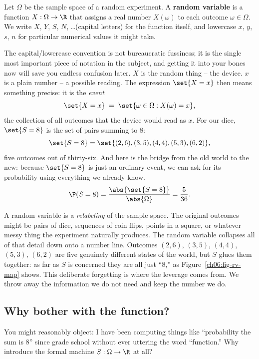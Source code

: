 \begin{definition}
\label{ch06:def-rv}
Let $\Omega$ be the sample space of a random experiment. A \textbf{random variable} is
a function $X : \Omega \to \R$ that assigns a real number $X(\omega)$ to each outcome
$\omega \in \Omega$. We write $X$, $Y$, $S$, $N$, \dots (capital letters) for the
function itself, and lowercase $x$, $y$, $s$, $n$ for particular numerical values it
might take.
\end{definition}

The capital/lowercase convention is not bureaucratic fussiness; it is the single most
important piece of notation in the subject, and getting it into your bones now will
save you endless confusion later. $X$ is the random thing -- the device. $x$ is a
plain number -- a possible reading. The expression $\set{X = x}$ then means something
precise: it is the \emph{event}
\[
  \set{X = x} \;=\; \set{\omega \in \Omega : X(\omega) = x},
\]
the collection of all outcomes that the device would read as $x$. For our dice,
$\set{S = 8}$ is the set of pairs summing to $8$:
\[
  \set{S = 8} = \set{(2,6),(3,5),(4,4),(5,3),(6,2)},
\]
five outcomes out of thirty-six. And here is the bridge from the old world to the new:
because $\set{S = 8}$ is just an ordinary event, we can ask for its probability using
everything we already know.
\[
  \P(S = 8) = \frac{\abs{\set{S=8}}}{\abs{\Omega}} = \frac{5}{36}.
\]

\begin{happeningbox}
A random variable is a \emph{relabeling} of the sample space. The original outcomes
might be pairs of dice, sequences of coin flips, points in a square, or whatever messy
thing the experiment naturally produces. The random variable collapses all of that
detail down onto a number line. Outcomes $(2,6)$, $(3,5)$, $(4,4)$, $(5,3)$, $(6,2)$
are five genuinely different states of the world, but $S$ glues them together: as far
as $S$ is concerned they are all just ``$8$,'' as Figure~\ref{ch06:fig-rv-map} shows.
This deliberate forgetting is where the leverage comes from. We throw away the
information we do not need and keep the number we do.
\end{happeningbox}

\subsection{Why bother with the function?}

You might reasonably object: I have been computing things like ``probability the sum
is $8$'' since grade school without ever uttering the word ``function.'' Why introduce
the formal machine $S : \Omega \to \R$ at all?

